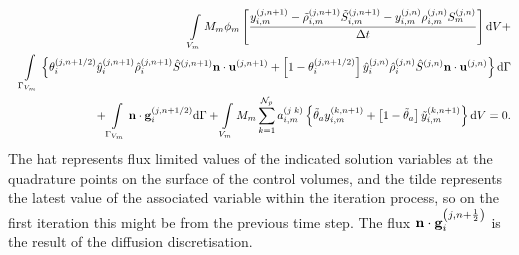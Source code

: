 \begin{eqnarray}
    && \int\limits_{V_{m}} M_{m} \phi_{m} \left[ \frc{ \mfr[y]{i,m}{j,n+1} - \mfr[\tilde{\rho}]{i,m}{j,n+1} \mfr[\tilde{S}]{i,m}{j,n+1} - \mfr[y]{i,m}{j,n}\mfr[\rho]{i,m}{j,n}\mfr[S]{m}{j,n} }{\Delta t} \right] \d V + \nonumber \\
%
    && \int\limits_{\Gamma_{V_m}} \left\{ \mfr[\theta]{i}{j,n+1/2} \mfr[\hat{y}]{i}{j,n+1} \mfr[\hat{\rho}]{i}{j,n+1} \mfr[\hat{S}]{}{j,n+1} \mathbf{n}\cdot\mfr[\mathbf{u}]{}{j,n+1} + \left[1-\mfr[\theta]{i}{j,n+1/2}\right] \mfr[\hat{y}]{i}{j,n} \mfr[\hat{\rho}]{i}{j,n} \mfr[\hat{S}]{}{j,n} \mathbf{n}\cdot \mfr[\mathbf{u}]{}{j,n} \right\}  \d\Gamma \nonumber \\
%
    && + \int\limits_{\Gamma_{V_m}}  \mathbf{n}\cdot\mfr[\mathbf{g}]{i}{j,n+1/2}\d\Gamma + \int\limits_{V_m} M_m \summation_{k=1}^{\mathcal{N}_{p}} \mfr[a]{i,m}{j\;k} \left\{ \tilde{\theta}_{a} \mfr[y]{i,m}{k,n+1} + \left[1-\tilde{\theta}_{a}\right] \mfr[\tilde{y}]{i,m}{k,n+1}\right\} \d V  = 0. \label{disc-phasej-comp-i}
\end{eqnarray}
The hat represents flux limited values of the indicated solution variables at the quadrature points on the surface of the control volumes, and the tilde  represents the latest value of the associated variable within the iteration process, so on the first iteration this might be from the previous time step. The flux $\mathbf{n}\cdot\mfr[\mathbf{g}]{i}{j,n+\frac{1}{2}}$ is the result of the diffusion discretisation. 


